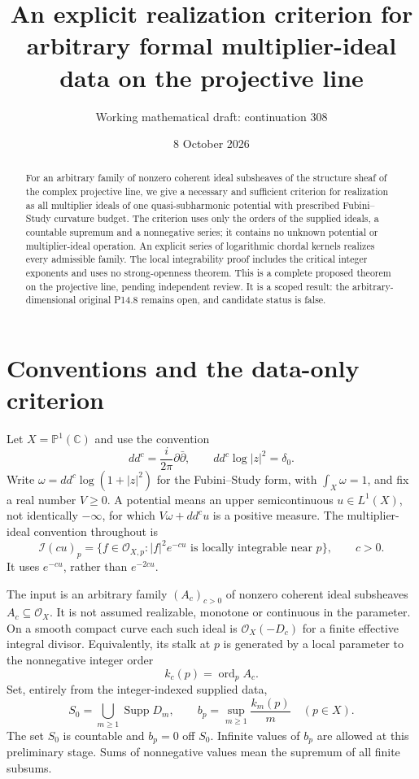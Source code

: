 \documentclass[11pt]{article}
\title{An explicit realization criterion for arbitrary formal multiplier-ideal data on the projective line}
\author{Working mathematical draft: continuation 308}
\date{8 October 2026}
\newcommand{\PP}{\mathbb P}
\newcommand{\OO}{\mathcal O}
\newcommand{\II}{\mathcal I}
\newcommand{\ord}{\operatorname{ord}}
\begin{document}
\maketitle
\begin{abstract}
For an arbitrary family of nonzero coherent ideal subsheaves of the structure sheaf of the complex projective line, we give a necessary and sufficient criterion for realization as all multiplier ideals of one quasi-subharmonic potential with prescribed Fubini--Study curvature budget. The criterion uses only the orders of the supplied ideals, a countable supremum and a nonnegative series; it contains no unknown potential or multiplier-ideal operation. An explicit series of logarithmic chordal kernels realizes every admissible family. The local integrability proof includes the critical integer exponents and uses no strong-openness theorem. This is a complete proposed theorem on the projective line, pending independent review. It is a scoped result: the arbitrary-dimensional original P14.8 remains open, and candidate status is false.
\end{abstract}

\section{Conventions and the data-only criterion}
Let $X=\PP^1(\mathbb C)$ and use the convention
\[
 dd^c=\frac{i}{2\pi}\partial\bar\partial,
 \qquad dd^c\log|z|^2=\delta_0.
\]
Write $\omega=dd^c\log(1+|z|^2)$ for the Fubini--Study form, with $\int_X\omega=1$, and fix a real number $V\geq0$. A potential means an upper semicontinuous $u\in L^1(X)$, not identically $-\infty$, for which $V\omega+dd^cu$ is a positive measure. The multiplier-ideal convention throughout is
\[
 \II(cu)_p=\{f\in\OO_{X,p}: |f|^2e^{-cu}\text{ is locally integrable near }p\},
 \qquad c>0.
\]
It uses $e^{-cu}$, rather than $e^{-2cu}$.

The input is an arbitrary family $(A_c)_{c>0}$ of nonzero coherent ideal subsheaves $A_c\subseteq\OO_X$. It is not assumed realizable, monotone or continuous in the parameter. On a smooth compact curve each such ideal is $\OO_X(-D_c)$ for a finite effective integral divisor. Equivalently, its stalk at $p$ is generated by a local parameter to the nonnegative integer order
\[
 k_c(p)=\ord_p A_c.
\]
Set, entirely from the integer-indexed supplied data,
\[
 S_0=\bigcup_{m\geq1}\operatorname{Supp}D_m,
 \qquad b_p=\sup_{m\geq1}\frac{k_m(p)}m \quad(p\in X).
\]
The set $S_0$ is countable and $b_p=0$ off $S_0$. Infinite values of $b_p$ are allowed at this preliminary stage. Sums of nonnegative values mean the supremum of all finite subsums.
\end{document}
